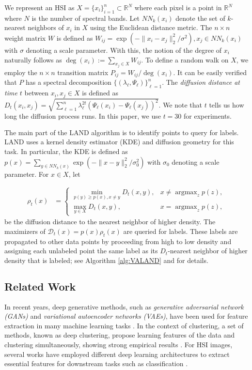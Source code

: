 \documentclass{article}
\DeclareMathOperator*{\argmax}{argmax} %
\def\R{\mathbb{R}}
\def\R{{\mathbb R}}
\newcommand{\Dt}{\mathcal{D}_{t}}
\begin{document}
We represent an HSI as $X=\{x_{i}\}_{i=1}^{n}\subset\mathbb{R}^{N}$ where each pixel is a point in $\R^{N}$ where $N$ is the number of spectral bands. Let $NN_{k}(x_{i})$ denote the set of $k$-nearest neighbors of $x_{i}$ in $X$ using the Euclidean distance metric.
The $n\times n$ weight matrix $W$ is defined as $W_{ij}=\exp(-\|x_{i}-x_{j}\|_{2}^{2}/\sigma^{2}), x_{j}\in NN_{k}(x_{i})$ with $\sigma$ denoting a scale parameter. With this, the notion of the degree of $x_{i}$ naturally follows as $\deg(x_{i}):=\sum_{x_{j}\in X}W_{ij}$. To define a random walk on $X$, we employ the $n\times n$ transition matrix $P_{ij}={W_{ij}}\big/{\deg(x_{i})}.$ It can be easily verified that $P$ has a spectral decomposition $\{(\lambda_{\ell},\Psi_{\ell})\}_{\ell=1}^{n}$. The \emph{diffusion distance at time $t$} between $x_{i},x_{j}\in X$ is defined as $D_{t}(x_{i},x_{j})=\sqrt{\sum\nolimits_{\ell=1}^{n}\lambda_{\ell}^{2t}(\Psi_{\ell}(x_{i})-\Psi_{\ell}(x_{j}))^{2}}$.  We note that $t$ tells us how long the diffusion process runs. In this paper, we use $t=30$ for experiments.

The main part of the LAND algorithm is to identify points to query for labels. LAND uses a kernel density estimator (KDE) and diffusion geometry for this task. In particular, the KDE is defined as $p(x)=\sum_{y\in NN_{k}(x)}\exp(-\|x-y\|_{2}^{2}/\sigma_{0}^{2})$ with $\sigma_0$ denoting a scale parameter.  For $x\in X$, let

\begin{align}\label{eqn:rho}
\rho_{t}(x) &=
\begin{cases}
\displaystyle\min_{p(y)\ge p(x), x\neq y} D_{t}(x,y), &x\neq \displaystyle\argmax_{z}p(z), \\
\displaystyle\max_{y\in X} D_{t}(x,y), & x=\displaystyle\argmax_{z}p(z),
\end{cases}
\end{align} 
be the diffusion distance to the nearest neighbor of higher density.  The maximizers of $\Dt(x)=p(x)\rho_{t}(x)$ are queried for labels.  These labels are propagated to other data points by proceeding from high to low density and assigning each unlabeled point the same label as its $D_{t}$-nearest neighbor of higher density that is labeled; see Algorithm \ref{alg:VALAND} and \cite{Maggioni2019_LAND} for details. 

\subsection{Related Work}
In recent years, deep generative methods, such as \emph{generative adversarial network (GANs)} and \emph{variational autoencoder networks (VAEs)}, have been used for feature extraction in many machine learning tasks \cite{ehsan2017infinite,makhzani2015adversarial}. In the context of clustering, a set of methods, known as deep clustering, propose learning features of the data and clustering simultaneously, showing strong empirical results \cite{tian2014learning,song2013auto,xie2016unsupervised}. For HSI images, several works have employed different deep learning architectures to extract essential features for downstream tasks such as classification \cite{chen2014deep,chen2016deep,li2017spectral,he2017multi,paoletti2019deep}. 
\end{document}
